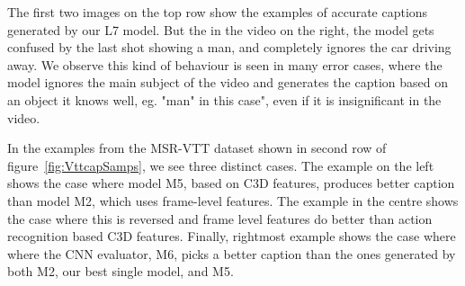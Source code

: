 The first two images on the top row show the examples of accurate captions generated
by our L7 model.
But the in the video on the right, the model gets confused by the last shot
showing a man, and completely ignores the car driving away.
We observe this kind of behaviour is seen in many error cases, where the model
ignores the main subject of the video and generates the caption based on an
object it knows well, eg. "man" in this case", even if it is insignificant in
the video.

In the examples from the MSR-VTT dataset shown in second row of
figure~\ref{fig:VttcapSamps}, we see three distinct cases.
The example on the left shows the case where model M5, based on C3D features,
produces better caption than model M2, which uses frame-level features.
The example in the centre shows the case where this is reversed and frame level features
do better than action recognition based C3D features.
Finally, rightmost example shows the case where where the CNN evaluator, M6,
picks a better caption than the ones generated by both M2, our best single
model, and M5.

